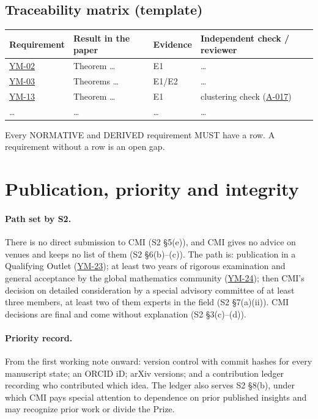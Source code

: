 \documentclass[11pt,a4paper]{article}
\newcommand{\idref}[1]{\hyperref[#1]{\textsf{#1}}}
\begin{document}
\subsection{Traceability matrix (template)}
\begin{center}\small
\begin{tabularx}{\textwidth}{@{}p{2.2cm}p{3.2cm}p{1.4cm}X@{}}
\toprule
Requirement & Result in the paper & Evidence & Independent check / reviewer\\
\midrule
\idref{YM-02} & Theorem \dots & E1 & \dots\\
\idref{YM-03} & Theorems \dots & E1/E2 & \dots\\
\idref{YM-13} & Theorem \dots & E1 & clustering check (\idref{A-017})\\
\dots & \dots & \dots & \dots\\
\bottomrule
\end{tabularx}
\end{center}
Every NORMATIVE and DERIVED requirement MUST have a row. A requirement without a row is an open gap.

\section{Publication, priority and integrity}\label{sec:publication}

\paragraph{Path set by S2.} There is no direct submission to CMI (S2 \S5(e)), and CMI gives no advice on venues and keeps no list of them (S2 \S6(b)--(c)). The path is: publication in a Qualifying Outlet (\idref{YM-23}); at least two years of rigorous examination and general acceptance by the global mathematics community (\idref{YM-24}); then CMI's decision on detailed consideration by a special advisory committee of at least three members, at least two of them experts in the field (S2 \S7(a)(ii)). CMI decisions are final and come without explanation (S2 \S3(c)--(d)).

\paragraph{Priority record.} From the first working note onward: version control with commit hashes for every manuscript state; an ORCID iD; arXiv versions; and a contribution ledger recording who contributed which idea. The ledger also serves S2 \S8(b), under which CMI pays special attention to dependence on prior published insights and may recognize prior work or divide the Prize.
\end{document}
